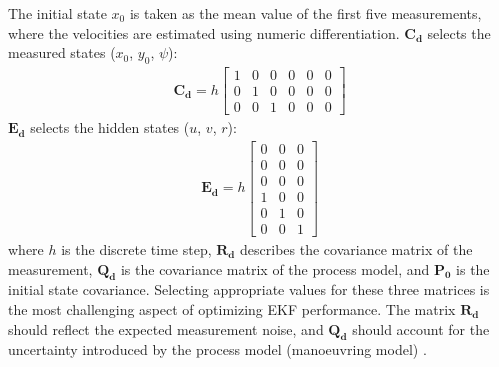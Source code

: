 The initial state \(x_0\) is taken as the mean value of the first five measurements, where the velocities are estimated using numeric differentiation.
\(\mathbf{C_d}\) selects the measured states (\(x_0\), \(y_0\), \(\psi\)):
\begin{equation}\label{equation:04.01_EK:eqcd}
\begin{split}\displaystyle \mathbf{C_{d}} = h \left[\begin{matrix}1 & 0 & 0 & 0 & 0 & 0\\0 & 1 & 0 & 0 & 0 & 0\\0 & 0 & 1 & 0 & 0 & 0\end{matrix}\right]\end{split}
\end{equation}
\(\mathbf{E_d}\) selects the hidden states (\(u\), \(v\), \(r\)):
\begin{equation}\label{equation:04.01_EK:eqed}
\begin{split}\displaystyle \mathbf{E_{d}} = h \left[\begin{matrix}0 & 0 & 0\\0 & 0 & 0\\0 & 0 & 0\\1 & 0 & 0\\0 & 1 & 0\\0 & 0 & 1\end{matrix}\right]\end{split}
\end{equation}
where \(h\) is the discrete time step, \(\mathbf{R_d}\) describes the covariance matrix of the measurement, \(\mathbf{Q_d}\) is the covariance matrix of the process model, and \(\mathbf{P_0}\) is the initial state covariance.
Selecting appropriate values for these three matrices is the most challenging aspect of optimizing EKF performance. The matrix \(\mathbf{R_d}\) should reflect the expected measurement noise,  and  \(\mathbf{Q_d}\) should account for the uncertainty introduced by the process model (manoeuvring model) .